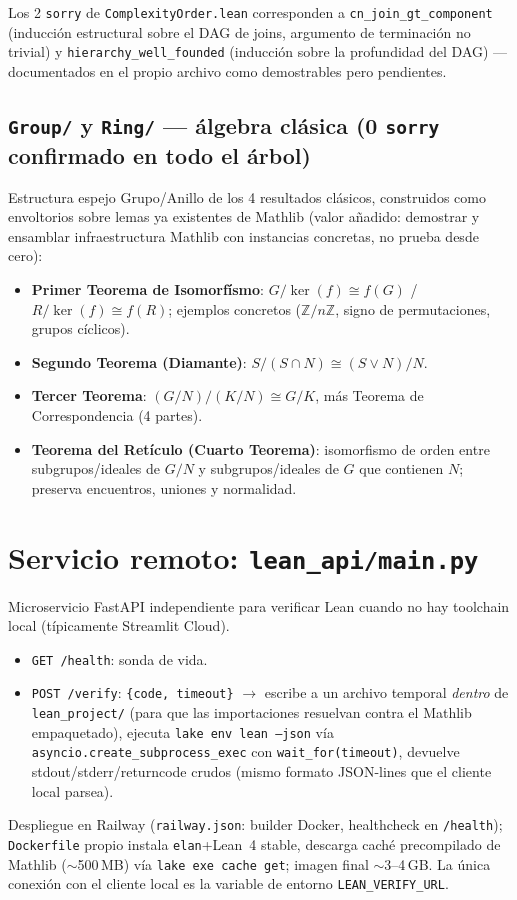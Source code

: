 \documentclass[11pt,a4paper]{report}
\newcommand{\code}[1]{\texttt{#1}}
\begin{document}
Los 2 \code{sorry} de \code{ComplexityOrder.lean} corresponden a \code{cn\_join\_gt\_component} (inducci\'on estructural sobre el DAG de joins, argumento de terminaci\'on no trivial) y \code{hierarchy\_well\_founded} (inducci\'on sobre la profundidad del DAG) --- documentados en el propio archivo como demostrables pero pendientes.

\subsection{\code{Group/} y \code{Ring/} --- \'algebra cl\'asica (0 \code{sorry} confirmado en todo el \'arbol)}

Estructura espejo Grupo/Anillo de los 4 resultados cl\'asicos, construidos como envoltorios sobre lemas ya existentes de Mathlib (valor a\~nadido: demostrar y ensamblar infraestructura Mathlib con instancias concretas, no prueba desde cero):

\begin{itemize}
  \item \textbf{Primer Teorema de Isomorf\'ismo}: $G/\ker(f)\cong f(G)$ / $R/\ker(f)\cong f(R)$; ejemplos concretos ($\mathbb{Z}/n\mathbb{Z}$, signo de permutaciones, grupos c\'iclicos).
  \item \textbf{Segundo Teorema (Diamante)}: $S/(S\cap N)\cong(S\vee N)/N$.
  \item \textbf{Tercer Teorema}: $(G/N)/(K/N)\cong G/K$, m\'as Teorema de Correspondencia (4 partes).
  \item \textbf{Teorema del Ret\'iculo (Cuarto Teorema)}: isomorfismo de orden entre subgrupos/ideales de $G/N$ y subgrupos/ideales de $G$ que contienen $N$; preserva encuentros, uniones y normalidad.
\end{itemize}

\section{Servicio remoto: \code{lean_api/main.py}}
\label{sec:lean-api}

Microservicio FastAPI independiente para verificar Lean cuando no hay toolchain local (t\'ipicamente Streamlit Cloud).
\begin{itemize}
  \item \code{GET /health}: sonda de vida.
  \item \code{POST /verify}: \code{\{code, timeout\}} $\to$ escribe a un archivo temporal \emph{dentro} de \code{lean_project/} (para que las importaciones resuelvan contra el Mathlib empaquetado), ejecuta \code{lake env lean --json} v\'ia \code{asyncio.create_subprocess_exec} con \code{wait_for(timeout)}, devuelve stdout/stderr/returncode crudos (mismo formato JSON-lines que el cliente local parsea).
\end{itemize}
Despliegue en Railway (\code{railway.json}: builder Docker, healthcheck en \code{/health}); \code{Dockerfile} propio instala \code{elan}+Lean~4 stable, descarga cach\'e precompilado de Mathlib ($\sim$500\,MB) v\'ia \code{lake exe cache get}; imagen final $\sim$3--4\,GB. La \'unica conexi\'on con el cliente local es la variable de entorno \code{LEAN\_VERIFY\_URL}.
\end{document}
